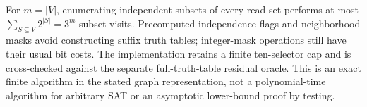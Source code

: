 For \(m=|V|\), enumerating independent subsets of every read set performs
at most \(\sum_{S\subseteq V}2^{|S|}=3^m\) subset visits. Precomputed
independence flags and neighborhood masks avoid constructing suffix truth
tables; integer-mask operations still have their usual bit costs. The
implementation retains a finite ten-selector cap and is cross-checked against
the separate full-truth-table residual oracle. This is an exact finite
algorithm in the stated graph representation, not a polynomial-time
algorithm for arbitrary SAT or an asymptotic lower-bound proof by testing.
